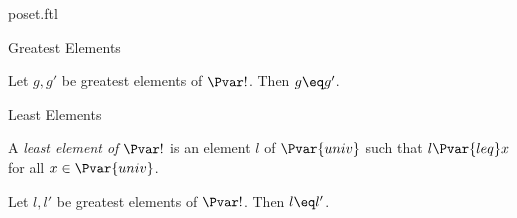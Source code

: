 \documentclass{naproche-library}
\begin{document}
\begin{smodule}[title=Posets]{poset.ftl}
\begin{sfragment}{Greatest Elements}
  \begin{proposition*}[forthel,id=GreatestElementIsUniqueThm]
    Let $g, g'$ be greatest elements of $\Pvar!$.
    Then $g\eq g'$.
  \end{proposition*}
\end{sfragment}

\begin{sfragment}{Least Elements}
  \begin{definition*}[forthel,id=LeastElementDef]
    A \emph{least element of $\Pvar!$} is an element $l$ of $\Pvar{univ}$ such that $l {\Pvar{leq}} x$ for all $x \in \Pvar{univ}$.
  \end{definition*}

  \begin{proposition*}[forthel,id=LeastElementIsUniqueThm]
    Let $l, l'$ be greatest elements of $\Pvar!$.
    Then $l\eq l'$.
  \end{proposition*}
\end{sfragment}
\end{smodule}
\end{document}
